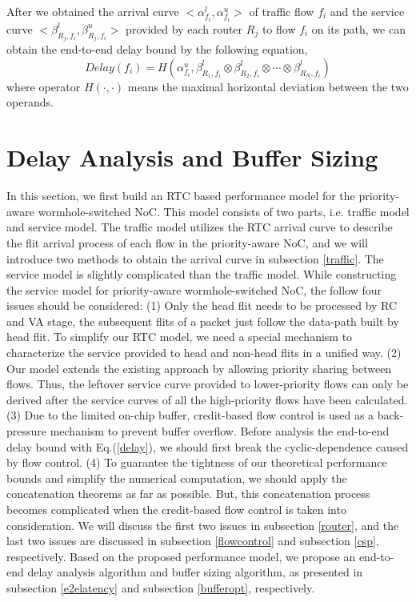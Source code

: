 \documentclass[10pt,journal]{IEEEtran}
\begin{document}
After we obtained the arrival curve $<\alpha^l_{f_i},\alpha^u_{f_i}>$ of traffic flow $f_i$ and the service curve $<\beta_{R_j,f_i}^l,\beta_{R_j,f_i}^u>$ provided by each router $R_j$ to flow $f_i$ on its path, we can obtain the end-to-end delay bound by the following equation,
\begin{equation}\label{delay}
Delay(f_i)=H(\alpha^u_{f_i},\beta^l_{R_1,f_i}\otimes\beta^l_{R_2,f_i}\otimes\cdots\otimes\beta^l_{R_N,f_i})
\end{equation}
where operator $H(\cdot,\cdot)$ means the maximal horizontal deviation between the two operands.

\section{Delay Analysis and Buffer Sizing}\label{modeling}
In this section, we first build an RTC based performance model for the priority-aware wormhole-switched NoC. This model consists of two parts, i.e. traffic model and service model. The traffic model utilizes the RTC arrival curve to describe the flit arrival process of each flow in the priority-aware NoC, and we will introduce two methods to obtain the arrival curve in subsection \ref{traffic}. The service model is slightly complicated than the traffic model. While constructing the service model for priority-aware wormhole-switched NoC, the follow four issues should be considered: (1) Only the head flit needs to be processed by RC and VA stage, the subsequent flits of a packet just follow the data-path built by head flit. To simplify our RTC model, we need a special mechanism to characterize the service provided to head and non-head flits in a unified way. (2) Our model extends the existing approach \cite{73}\cite{Qian489900} by allowing priority sharing between flows. Thus, the leftover service curve provided to lower-priority flows can only be derived after the service curves of all the high-priority flows have been calculated. (3) Due to the limited on-chip buffer, credit-based flow control is used as a back-pressure mechanism to prevent buffer overflow. Before analysis the end-to-end delay bound with Eq.(\ref{delay}), we should first break the cyclic-dependence caused by flow control. (4) To guarantee the tightness of our theoretical performance bounds and simplify the numerical computation, we should apply the concatenation theorems as far as possible. But, this concatenation process becomes complicated when the credit-based flow control is taken into consideration. We will discuss the first two issues in subsection \ref{router}, and the last two issues are discussed in subsection \ref{flowcontrol} and subsection \ref{csp}, respectively. Based on the proposed performance model, we propose an end-to-end delay analysis algorithm and buffer sizing algorithm, as presented in subsection \ref{e2elatency} and subsection \ref{bufferopt}, respectively.
\end{document}
